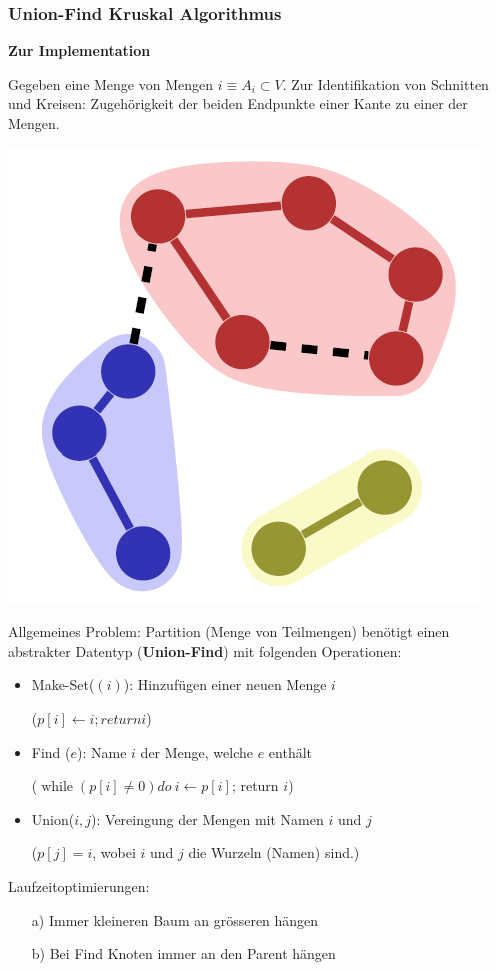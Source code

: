 \begin{sectionbox}
\subsubsection{Union-Find Kruskal Algorithmus}\smallskip
\textbf{Zur Implementation}\par
Gegeben eine Menge von Mengen $i \equiv A_{i} \subset V$. Zur Identifikation von Schnitten und Kreisen: Zugehörigkeit der beiden Endpunkte einer Kante zu einer der Mengen.\par
\begin{center}
    \includegraphics[width = 0.35\columnwidth]{../img/MST_Sym.png}\par
\end{center}\smallskip

Allgemeines Problem: Partition (Menge von Teilmengen) benötigt einen abstrakter Datentyp (\textbf{Union-Find}) mit folgenden Operationen:\par
\begin{itemize}
    \item Make-Set($(i)$): Hinzufügen einer neuen Menge $i$\par($p[i] \leftarrow i; return i$)
    \item Find ($e$): Name $i$ der Menge, welche $e$ enthält \par($\operatorname{while} (p[i]\neq 0) do\ i \leftarrow p[i]$; return $i$)
    \item Union($i,j$): Vereingung der Mengen mit Namen $i$ und $j$ \par($p[j]=i$, wobei $i$ und $j$ die Wurzeln (Namen) sind.)
\end{itemize}\smallskip
Laufzeitoptimierungen:\par
\begin{itemize}
    \item[a)] Immer kleineren Baum an grösseren hängen
    \item[b)] Bei Find Knoten immer an den Parent hängen
\end{itemize}\par\smallskip


\end{sectionbox}
